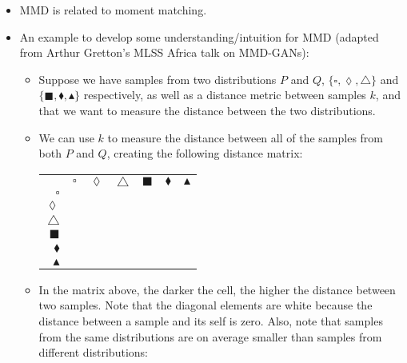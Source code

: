 \documentclass{article}
\begin{document}
\begin{itemize}
	\item MMD is related to moment matching.
	\item An example to develop some understanding/intuition for MMD (adapted from Arthur Gretton's MLSS Africa talk on MMD-GANs):
	\begin{itemize}
		\item Suppose we have samples from two distributions $P$ and $Q$, $\{\square,\lozenge,\triangle\}$ and $\{\blacksquare,\blacklozenge,\blacktriangle\}$ respectively, as well as a distance metric between samples $k$, and that we want to measure the distance between the two distributions.
		\item We can use $k$ to measure the distance between all of the samples from both $P$ and $Q$, creating the following distance matrix:
		
		\begin{center}
		\begin{tabular}{ rcccccc }
			\multicolumn{1}{r}{}
			&  \multicolumn{1}{c}{$\square$}
			& \multicolumn{1}{c}{$\lozenge$}
			& \multicolumn{1}{c}{$\triangle$}
			& \multicolumn{1}{c}{$\blacksquare$}
			& \multicolumn{1}{c}{$\blacklozenge$}
			& \multicolumn{1}{c}{$\blacktriangle$} \\
			$\square$ &  & \cellcolor{black!15} & \cellcolor{black!10} & \cellcolor{black!40} & \cellcolor{black!45} & \cellcolor{black!30} \\
			$\lozenge$ & \cellcolor{black!15} & & \cellcolor{black!12} & \cellcolor{black!20} & \cellcolor{black!55} & \cellcolor{black!43} \\
			$\triangle$ & \cellcolor{black!10} & \cellcolor{black!12}  & & \cellcolor{black!23} & \cellcolor{black!30} & \cellcolor{black!60} \\
			$\blacksquare$ & \cellcolor{black!40} & \cellcolor{black!20} & \cellcolor{black!23} & & \cellcolor{black!5} & \cellcolor{black!20} \\
			$\blacklozenge$ & \cellcolor{black!45} & \cellcolor{black!55} & \cellcolor{black!30} & \cellcolor{black!5} & & \cellcolor{black!7}\\
			$\blacktriangle$ & \cellcolor{black!30} & \cellcolor{black!43} & \cellcolor{black!60} & \cellcolor{black!20} & \cellcolor{black!7} & \\
		\end{tabular}
		\end{center}
	
		\item In the matrix above, the darker the cell, the higher the distance between two samples. Note that the diagonal elements are white because the distance between a sample and its self is zero. Also, note that samples from the same distributions are on average smaller than samples from different distributions:
		

\end{itemize}
\end{itemize}
\end{document}
